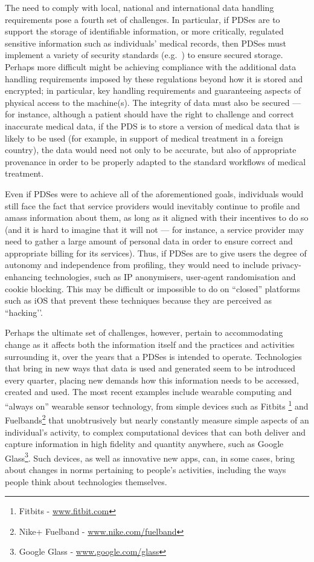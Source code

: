 \documentclass[graybox]{svmult}
\begin{document}
The need to comply with local, national and international data handling requirements pose a fourth set of challenges. In particular, if  PDSes are to support the storage of identifiable information, or more critically, regulated sensitive information such as individuals’ medical records, then PDSes must implement a variety of security standards (e.g.~\cite{mccallister2010guide}) to ensure secured storage.  Perhaps more difficult might be achieving compliance with the additional data handling requirements imposed by these regulations beyond how it is stored and encrypted; in particular, key handling requirements and guaranteeing aspects of physical access to the machine(s). The integrity of data must also be secured --- for instance, although a patient should have the right to challenge and correct inaccurate medical data, if the PDS is to store a version of medical data that is likely to be used (for example, in support of medical treatment in a foreign country), the data would need not only to be accurate, but also of appropriate provenance in order to be properly adapted to the standard workflows of medical treatment.

Even if PDSes were to achieve all of the aforementioned goals, individuals would still face the fact that service providers would inevitably continue to profile and amass information about them, as long as it aligned with their incentives to do so (and it is hard to imagine that it will not --- for instance, a service provider may need to gather a large amount of personal data in order to ensure correct and appropriate billing for its services).  Thus, if PDSes are to give users the degree of autonomy and independence from profiling, they would need to include privacy-enhancing technologies, such as IP anonymisers, user-agent randomisation and cookie blocking. This may be difficult or impossible to do on ``closed'' platforms such as iOS that prevent these techniques because they are perceived as ``hacking’’.

Perhaps the ultimate set of challenges, however, pertain to accommodating change as it affects both the information itself and the practices and activities surrounding it, over the years that a PDSes is intended to operate.  Technologies that bring in new ways that data is used and generated seem to be introduced every quarter, placing new demands how this information needs to be accessed, created and used.  The most recent examples include wearable computing and ``always on'' wearable sensor technology, from simple devices such as Fitbits \footnote{Fitbits - \url{www.fitbit.com}} and Fuelbands\footnote{Nike+ Fuelband - \url{www.nike.com/fuelband}} that unobtrusively but nearly constantly measure simple aspects of an individual's activity, to complex computational devices that can both deliver and capture information in high fidelity and quantity anywhere, such as Google Glass\footnote{Google Glass - \url{www.google.com/glass}}.  Such devices, as well as innovative new apps, can, in some cases, bring about changes in norms pertaining to people's activities, including the ways people think about technologies themselves.
\end{document}
